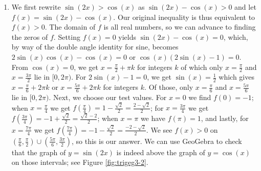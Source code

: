 {\begin{enumerate}
\item  We first rewrite  $\sin(2x) > \cos(x)$   as $\sin(2x) - \cos(x) > 0$ and let $f(x) = \sin(2x) - \cos(x)$.  Our original inequality is thus equivalent to $f(x) > 0$. The domain of $f$ is all real numbers, so we can advance to finding the zeros of $f$.  Setting $f(x) = 0$ yields $\sin(2x) - \cos(x) = 0$, which, by way of the double angle identity for sine, becomes $2\sin(x)\cos(x) - \cos(x) = 0$ or $\cos(x) (2\sin(x) - 1) = 0$.  From $\cos(x) = 0$, we get $x = \frac{\pi}{2} + \pi k$ for integers $k$ of which only $x = \frac{\pi}{2}$ and $x = \frac{3\pi}{2}$ lie in $[0,2\pi)$.  For $2\sin(x) - 1 = 0$, we get $\sin(x) = \frac{1}{2}$ which gives $x = \frac{\pi}{6} + 2\pi k$ or $x = \frac{5\pi}{6} + 2\pi k$ for integers $k$.  Of those, only $x = \frac{\pi}{6}$ and $x = \frac{5\pi}{6}$ lie in $[0,2\pi)$.  Next, we choose our test values.  For $x =0$ we find $f(0) = -1$; when $x = \frac{\pi}{4}$ we get $f\left(\frac{\pi}{4}\right) =1 - \frac{\sqrt{2}}{2} = \frac{2 - \sqrt{2}}{2}$;  for $x = \frac{3\pi}{4}$ we get $f\left(\frac{3\pi}{4}\right) =-1 + \frac{\sqrt{2}}{2} =  \frac{\sqrt{2} - 2}{2}$;  when $x=\pi$ we have $f(\pi) = 1$, and lastly, for $x = \frac{7\pi}{4}$ we get $f\left(\frac{7\pi}{4}\right) = -1 - \frac{\sqrt{2}}{2} =  \frac{-2 - \sqrt{2}}{2}$.  We see $f(x) > 0$ on $\left(\frac{\pi}{6}, \frac{\pi}{2}\right) \cup \left(\frac{5\pi}{6}, \frac{3\pi}{2}\right)$, so this is our answer.  We can use GeoGebra to check that the graph of $y = \sin(2x)$ is indeed above the graph of $y = \cos(x)$ on those intervals; see Figure \ref{fig:trigeg3-2}. 



\end{enumerate}}
